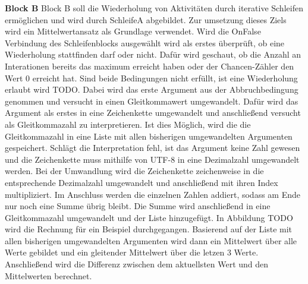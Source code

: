     \textbf{Block B}
    Block B soll die Wiederholung von Aktivitäten durch iterative Schleifen ermöglichen und wird durch SchleifeA abgebildet.
    Zur umsetzung dieses Ziels wird ein Mittelwertansatz als Grundlage verwendet.
    Wird die OnFalse Verbindung des Schleifenblocks ausgewählt wird als erstes überprüft, ob eine Wiederholung stattfinden darf oder nicht.
    Dafür wird geschaut, ob die Anzahl an Interationen bereits das maximum erreicht haben oder der Chancen-Zähler den Wert 0 erreicht hat.
    Sind beide Bedingungen nicht erfüllt, ist eine Wiederholung erlaubt wird TODO.
    Dabei wird das erste Argument aus der Abbruchbedingung genommen und versucht in einen Gleitkommawert umgewandelt. %
    Dafür wird das Argument als erstes in eine Zeichenkette umgewandelt und anschließend versucht als Gleitkommazahl zu interpretieren.
    Ist dies Möglich, wird die die Gleitkommazahl in eine Liste mit allen bisherigen umgewandelten Argumenten gespeichert.
    Schlägt die Interpretation fehl, ist das Argument keine Zahl gewesen und die Zeichenkette muss mithilfe von UTF-8 in eine Dezimalzahl umgewandelt werden.
    Bei der Umwandlung wird die Zeichenkette zeichenweise in die entsprechende Dezimalzahl umgewandelt und anschließend mit ihren Index multipliziert.
    Im Anschluss werden die einzelnen Zahlen addiert, sodass am Ende nur noch eine Summe übrig bleibt.
    Die Summe wird anschließend in eine Gleitkommazahl umgewandelt und der Liste hinzugefügt.
    In Abbildung TODO wird die Rechnung für ein Beispiel durchgegangen.
    Basierend auf der Liste mit allen bisherigen umgewandelten Argumenten wird dann ein Mittelwert über alle Werte gebildet und ein gleitender Mittelwert über die letzen 3 Werte.
    Anschließend wird die Differenz zwischen dem aktuellsten Wert und den Mittelwerten berechnet. 
